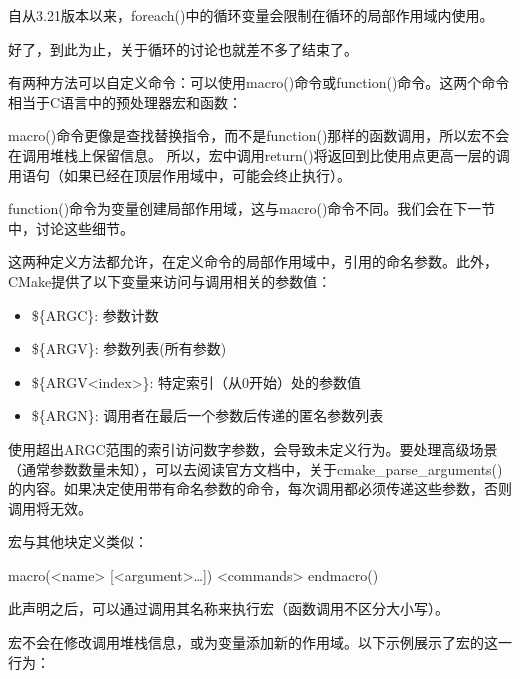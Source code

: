 自从3.21版本以来，foreach()中的循环变量会限制在循环的局部作用域内使用。

好了，到此为止，关于循环的讨论也就差不多了结束了。


有两种方法可以自定义命令：可以使用macro()命令或function()命令。这两个命令相当于C语言中的预处理器宏和函数：

macro()命令更像是查找替换指令，而不是function()那样的函数调用，所以宏不会在调用堆栈上保留信息。 所以，宏中调用return()将返回到比使用点更高一层的调用语句（如果已经在顶层作用域中，可能会终止执行）。

function()命令为变量创建局部作用域，这与macro()命令不同。我们会在下一节中，讨论这些细节。

这两种定义方法都允许，在定义命令的局部作用域中，引用的命名参数。此外，CMake提供了以下变量来访问与调用相关的参数值：

\begin{itemize}
\item
\$\{ARGC\}: 参数计数

\item
\$\{ARGV\}: 参数列表(所有参数)

\item
\$\{ARGV<index>\}: 特定索引（从0开始）处的参数值

\item
\$\{ARGN\}: 调用者在最后一个参数后传递的匿名参数列表
\end{itemize}

使用超出ARGC范围的索引访问数字参数，会导致未定义行为。要处理高级场景（通常参数数量未知），可以去阅读官方文档中，关于cmake\_parse\_arguments()的内容。如果决定使用带有命名参数的命令，每次调用都必须传递这些参数，否则调用将无效。


宏与其他块定义类似：

\begin{shell}
macro(<name> [<argument>…])
    <commands>
endmacro()
\end{shell}

此声明之后，可以通过调用其名称来执行宏（函数调用不区分大小写）。

宏不会在修改调用堆栈信息，或为变量添加新的作用域。以下示例展示了宏的这一行为：




